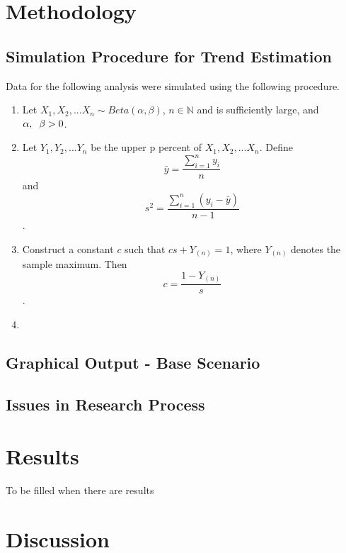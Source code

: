 \documentclass[
	letterpaper, %
	10pt, %
	unnumberedsections, %
	twoside, %
]{LTJournalArticle}
\begin{document}

\section{Methodology}

\subsection{Simulation Procedure for Trend Estimation}

Data for the following analysis were simulated using the following procedure.
\begin{enumerate}
	\item Let $X_1, X_2,...X_n \sim Beta(\alpha, \beta)$, $n \in \mathds{N}$ and is sufficiently large, and $\alpha,\hspace{0.2cm}\beta > 0$.
	\item Let $Y_1,Y_2,...Y_n$ be the upper p percent of $X_1,X_2,...X_n$. 
	Define $$\bar{y} = \frac{\sum_{i=1}^{n}y_i}{n}$$
	and $$s^2 = \frac{\sum_{i=1}^{n}(y_i-\bar{y})}{n-1}$$.
	\item Construct a constant $c$ such that $cs + Y_{(n)} = 1$, where $Y_{(n)}$ denotes the sample maximum. Then 
	$$c = \frac{1-Y_{(n)}}{s}$$.
	\item 
\end{enumerate}

\subsection{Graphical Output - Base Scenario}

\subsection{Issues in Research Process}



\section{Results}

To be filled when there are results

\section{Discussion}


\printbibliography %

\end{document}
